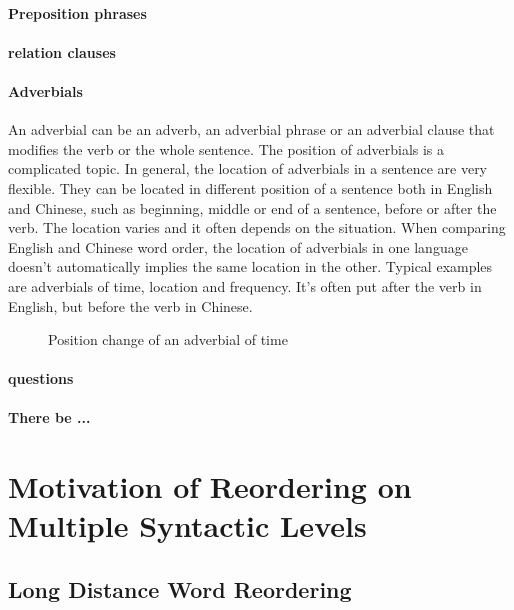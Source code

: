 \paragraph{Preposition phrases}

\paragraph{relation clauses}

\paragraph{Adverbials}
An adverbial can be an adverb, an adverbial phrase or an adverbial clause that modifies the verb or the whole sentence. The position of adverbials is a complicated topic. In general, the location of adverbials in a sentence are very flexible. They can be located in different position of a sentence both in English and Chinese, such as beginning, middle or end of a sentence, before or after the verb. The location varies and it often depends on the situation. When comparing English and Chinese word order, the location of adverbials in one language doesn't automatically implies the same location in the other. Typical examples are adverbials of time, location and frequency. It's often put after the verb in English, but before the verb in Chinese. 
\begin{figure}[H]
\centering
%
\caption{Position change of an adverbial of time}
\end{figure}


\paragraph{questions}

\paragraph{There be ...}
\section{Motivation of Reordering on Multiple Syntactic Levels}
\label{ch:ReorderingApproach:sec:Motivation}



\subsection{Long Distance Word Reordering}

